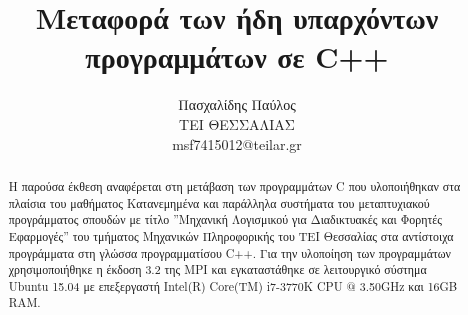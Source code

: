 \documentclass[10pt,a4paper]{article}
\title{Μεταφορά των ήδη υπαρχόντων προγραμμάτων σε C++}
\author{Πασχαλίδης Παύλος\\ΤΕΙ ΘΕΣΣΑΛΙΑΣ\\msf7415012@teilar.gr}
\date{}
\begin{document}
	
	\maketitle
	\newpage	
			
	\begin{abstract}
	Η παρούσα έκθεση αναφέρεται στη μετάβαση των προγραμμάτων C που υλοποιήθηκαν στα πλαίσια του μαθήματος Κατανεμημένα και παράλληλα συστήματα του μεταπτυχιακού προγράμματος σπουδών με τίτλο ''Μηχανική Λογισμικού για Διαδικτυακές και Φορητές Εφαρμογές'' του τμήματος Μηχανικών Πληροφορικής του ΤΕΙ Θεσσαλίας στα αντίστοιχα προγράμματα στη γλώσσα προγραμματίσου C++. Για την υλοποίηση των προγραμμάτων χρησιμοποιήθηκε η έκδοση 3.2 της MPI και εγκαταστάθηκε σε λειτουργικό σύστημα Ubuntu 15.04 με επεξεργαστή Intel(R) Core(TM) i7-3770K CPU @ 3.50GHz και 16GB RAM.
	\end{abstract}

	
	

			
%	
%	
%	
	
	
%	
	
\end{document}
